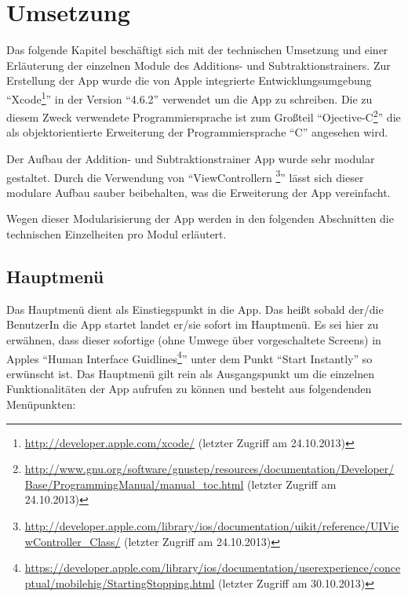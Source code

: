 
\chapter{Umsetzung}
\label{chap:impl}

Das folgende Kapitel beschäftigt sich mit der technischen Umsetzung und einer Erläuterung der einzelnen
Module des Additions- und Subtraktionstrainers. Zur Erstellung der App wurde die von Apple integrierte Entwicklungsumgebung 
\enquote{Xcode\footnote{\url{http://developer.apple.com/xcode/} (letzter Zugriff am 24.10.2013)}} in der Version \enquote{4.6.2} verwendet um die App zu schreiben.
Die zu diesem Zweck verwendete Programmiersprache ist zum Großteil 
\enquote{Ojective-C\footnote{\url{http://www.gnu.org/software/gnustep/resources/documentation/Developer/Base/ProgrammingManual/manual_toc.html} (letzter Zugriff am 24.10.2013)}} die als
objektorientierte Erweiterung der Programmiersprache \enquote{C} angesehen wird.

Der Aufbau der Addition- und Subtraktionstrainer App wurde sehr modular gestaltet. Durch die Verwendung 
von \enquote{ViewControllern \footnote{\url{http://developer.apple.com/library/ios/documentation/uikit/reference/UIViewController_Class/} (letzter Zugriff am 24.10.2013)}}
lässt sich dieser modulare Aufbau sauber beibehalten, was die Erweiterung der App vereinfacht.

Wegen dieser Modularisierung der App werden in den folgenden Abschnitten die technischen Einzelheiten pro Modul erläutert.
\section{Hauptmenü}
Das Hauptmenü dient als Einstiegspunkt in die App. Das heißt sobald der/die BenutzerIn die App startet
landet er/sie sofort im Hauptmenü. Es sei hier zu erwähnen, dass dieser sofortige
(ohne Umwege über vorgeschaltete Screens) in Apples \enquote{Human Interface Guidlines\footnote{\url{https://developer.apple.com/library/ios/documentation/userexperience/conceptual/mobilehig/StartingStopping.html} (letzter Zugriff am 30.10.2013)}}
unter dem Punkt \enquote{Start Instantly} so erwünscht ist.
Das Hauptmenü gilt rein als Ausgangspunkt um die einzelnen Funktionalitäten
der App aufrufen zu können und besteht aus folgendenden Menüpunkten:

